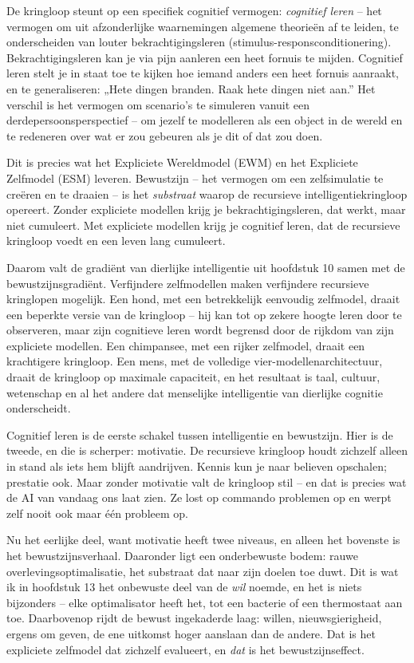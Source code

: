 \documentclass[11pt, twoside, openright]{book}
\begin{document}
De kringloop steunt op een specifiek cognitief vermogen: \textit{cognitief leren} -- het vermogen om uit afzonderlijke waarnemingen algemene theorieën af te leiden, te onderscheiden van louter bekrachtigingsleren (stimulus-responsconditionering). Bekrachtigingsleren kan je via pijn aanleren een heet fornuis te mijden. Cognitief leren stelt je in staat toe te kijken hoe iemand anders een heet fornuis aanraakt, en te generaliseren: „Hete dingen branden. Raak hete dingen niet aan.” Het verschil is het vermogen om scenario’s te simuleren vanuit een derdepersoonsperspectief -- om jezelf te modelleren als een object in de wereld en te redeneren over wat er zou gebeuren als je dit of dat zou doen.

Dit is precies wat het Expliciete Wereldmodel (EWM) en het Expliciete Zelfmodel (ESM) leveren. Bewustzijn -- het vermogen om een zelfsimulatie te creëren en te draaien -- is het \textit{substraat} waarop de recursieve intelligentiekringloop opereert. Zonder expliciete modellen krijg je bekrachtigingsleren, dat werkt, maar niet cumuleert. Met expliciete modellen krijg je cognitief leren, dat de recursieve kringloop voedt en een leven lang cumuleert.

Daarom valt de gradiënt van dierlijke intelligentie uit hoofdstuk 10 samen met de bewustzijnsgradiënt. Verfijndere zelfmodellen maken verfijndere recursieve kringlopen mogelijk. Een hond, met een betrekkelijk eenvoudig zelfmodel, draait een beperkte versie van de kringloop -- hij kan tot op zekere hoogte leren door te observeren, maar zijn cognitieve leren wordt begrensd door de rijkdom van zijn expliciete modellen. Een chimpansee, met een rijker zelfmodel, draait een krachtigere kringloop. Een mens, met de volledige vier-modellenarchitectuur, draait de kringloop op maximale capaciteit, en het resultaat is taal, cultuur, wetenschap en al het andere dat menselijke intelligentie van dierlijke cognitie onderscheidt.

Cognitief leren is de eerste schakel tussen intelligentie en bewustzijn. Hier is de tweede, en die is scherper: motivatie. De recursieve kringloop houdt zichzelf alleen in stand als iets hem blijft aandrijven. Kennis kun je naar believen opschalen; prestatie ook. Maar zonder motivatie valt de kringloop stil -- en dat is precies wat de AI van vandaag ons laat zien. Ze lost op commando problemen op en werpt zelf nooit ook maar één probleem op.

Nu het eerlijke deel, want motivatie heeft twee niveaus, en alleen het bovenste is het bewustzijnsverhaal. Daaronder ligt een onderbewuste bodem: rauwe overlevingsoptimalisatie, het substraat dat naar zijn doelen toe duwt. Dit is wat ik in hoofdstuk 13 het onbewuste deel van de \textit{wil} noemde, en het is niets bijzonders -- elke optimalisator heeft het, tot een bacterie of een thermostaat aan toe. Daarbovenop rijdt de bewust ingekaderde laag: willen, nieuwsgierigheid, ergens om geven, de ene uitkomst hoger aanslaan dan de andere. Dat is het expliciete zelfmodel dat zichzelf evalueert, en \textit{dat} is het bewustzijnseffect.
\end{document}
